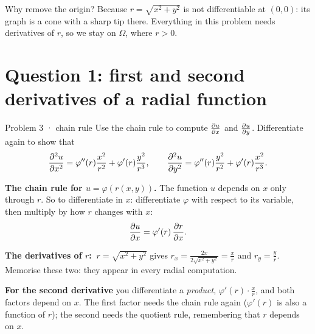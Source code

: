 \begin{intuition}
Why remove the origin? Because $r=\sqrt{x^2+y^2}$ is not differentiable at $(0,0)$: its graph is a
cone with a sharp tip there. Everything in this problem needs derivatives of $r$, so we stay on
$\Omega$, where $r>0$.
\end{intuition}


\section{Question 1: first and second derivatives of a radial function}

\begin{question}{Problem 3 \;·\; chain rule}
Use the chain rule to compute $\frac{\partial u}{\partial x}$ and $\frac{\partial u}{\partial y}$. Differentiate again to show that
\[
  \frac{\partial^2 u}{\partial x^2}=\varphi''(r)\frac{x^2}{r^2}+\varphi'(r)\frac{y^2}{r^3},\qquad
  \frac{\partial^2 u}{\partial y^2}=\varphi''(r)\frac{y^2}{r^2}+\varphi'(r)\frac{x^2}{r^3}.
\]
\end{question}

\begin{lesson}
\textbf{The chain rule for $u=\varphi(r(x,y))$.} The function $u$ depends on $x$ only through $r$.
So to differentiate in $x$: differentiate $\varphi$ with respect to its variable, then multiply by how
$r$ changes with $x$:
\[
  \frac{\partial u}{\partial x}=\varphi'(r)\,\frac{\partial r}{\partial x} .
\]
\begin{center}
\end{center}
\textbf{The derivatives of $r$:} $\ r=\sqrt{x^2+y^2}$ gives $r_x=\frac{2x}{2\sqrt{x^2+y^2}}=\frac xr$ and
$r_y=\frac yr$. Memorise these two: they appear in every radial computation.

\textbf{For the second derivative} you differentiate a \emph{product}, $\varphi'(r)\cdot\frac xr$, and
both factors depend on $x$. The first factor needs the chain rule again ($\varphi'(r)$ is also a
function of $r$); the second needs the quotient rule, remembering that $r$ depends on $x$.
\end{lesson}


